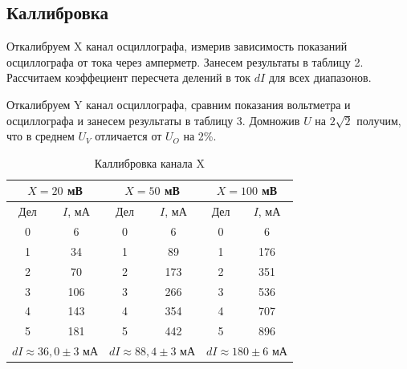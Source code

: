 \documentclass[a4paper]{article}
\theoremstyle{definition}
\theoremstyle{remark}
\begin{document}
\subsection{Каллибровка}

Откалибруем X канал осциллографа, измерив зависимость показаний осциллографа от тока через амперметр. Занесем результаты в таблицу 2. Рассчитаем коэффециент пересчета делений в ток $dI$ для всех диапазонов. \medskip

Откалибруем Y канал осциллографа, сравним показания вольтметра и осциллографа и занесем результаты в таблицу 3. Домножив $U$ на $2\sqrt{2}$ получим, что в среднем  $U_{V}$ отличается от $U_{O}$ на 2\%.

\begin{table}[h!]
    \centering
    \caption{Каллибровка канала X}
    \begin{tabular}{|cc|cc|cc|}
    \hline
    \multicolumn{2}{|c|}{$X = 20$ мВ}                & \multicolumn{2}{c|}{$X = 50$ мВ}                & \multicolumn{2}{c|}{$X = 100$ мВ}              \\ \hline
    \multicolumn{1}{|c|}{Дел}        & $I$, мА       & \multicolumn{1}{c|}{Дел}        & $I$, мА       & \multicolumn{1}{c|}{Дел}       & $I$, мА       \\ \hline
    \multicolumn{1}{|c|}{0}          & 6             & \multicolumn{1}{c|}{0}          & 6             & \multicolumn{1}{c|}{0}         & 6             \\ \hline
    \multicolumn{1}{|c|}{1}          & 34            & \multicolumn{1}{c|}{1}          & 89            & \multicolumn{1}{c|}{1}         & 176           \\ \hline
    \multicolumn{1}{|c|}{2}          & 70            & \multicolumn{1}{c|}{2}          & 173           & \multicolumn{1}{c|}{2}         & 351           \\ \hline
    \multicolumn{1}{|c|}{3}          & 106           & \multicolumn{1}{c|}{3}          & 266           & \multicolumn{1}{c|}{3}         & 536           \\ \hline
    \multicolumn{1}{|c|}{4}          & 143           & \multicolumn{1}{c|}{4}          & 354           & \multicolumn{1}{c|}{4}         & 707           \\ \hline
    \multicolumn{1}{|c|}{5}          & 181           & \multicolumn{1}{c|}{5}          & 442           & \multicolumn{1}{c|}{5}         & 896           \\ \hline
    \multicolumn{2}{|c|}{$dI \approx 36,0 \pm 3$ мА} & \multicolumn{2}{c|}{$dI \approx 88,4 \pm 3$ мА} & \multicolumn{2}{c|}{$dI \approx 180 \pm 6$ мА} \\ \hline
    \end{tabular}
    \end{table}
\end{document}
